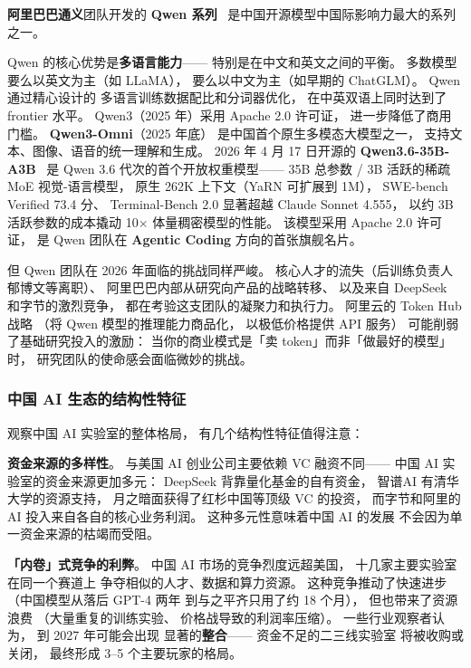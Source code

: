 \textbf{阿里巴巴通义}团队开发的 \textbf{Qwen 系列}~\cite{qwen2025qwen3}
是中国开源模型中国际影响力最大的系列之一。

Qwen 的核心优势是\textbf{多语言能力}——
特别是在中文和英文之间的平衡。
多数模型要么以英文为主（如 LLaMA），
要么以中文为主（如早期的 ChatGLM）。
Qwen 通过精心设计的
多语言训练数据配比和分词器优化，
在中英双语上同时达到了 frontier 水平。
Qwen3（2025 年）采用 Apache 2.0 许可证，
进一步降低了商用门槛。
\textbf{Qwen3-Omni}（2025 年底）
是中国首个原生多模态大模型之一，
支持文本、图像、语音的统一理解和生成。
2026 年 4 月 17 日开源的 \textbf{Qwen3.6-35B-A3B}~\cite{qwen36_35b_a3b_2026}
是 Qwen 3.6 代次的首个开放权重模型——
35B 总参数 / 3B 活跃的稀疏 MoE 视觉-语言模型，
原生 262K 上下文（YaRN 可扩展到 1M），
SWE-bench Verified 73.4 分、
Terminal-Bench 2.0 显著超越 Claude Sonnet 4.555，
以约 3B 活跃参数的成本撬动 10$\times$ 体量稠密模型的性能。
该模型采用 Apache 2.0 许可证，
是 Qwen 团队在 \textbf{Agentic Coding} 方向的首张旗舰名片。

但 Qwen 团队在 2026 年面临的挑战同样严峻。
核心人才的流失（后训练负责人郁博文等离职）、
阿里巴巴内部从研究向产品的战略转移、
以及来自 DeepSeek 和字节的激烈竞争，
都在考验这支团队的凝聚力和执行力。
阿里云的 Token Hub 战略
（将 Qwen 模型的推理能力商品化，
以极低价格提供 API 服务）
可能削弱了基础研究投入的激励：
当你的商业模式是「卖 token」而非「做最好的模型」时，
研究团队的使命感会面临微妙的挑战。

\subsubsection{中国 AI 生态的结构性特征}

观察中国 AI 实验室的整体格局，
有几个结构性特征值得注意：

\textbf{资金来源的多样性}。
与美国 AI 创业公司主要依赖 VC 融资不同——
中国 AI 实验室的资金来源更加多元：
DeepSeek 背靠量化基金的自有资金，
智谱AI 有清华大学的资源支持，
月之暗面获得了红杉中国等顶级 VC 的投资，
而字节和阿里的 AI 投入来自各自的核心业务利润。
这种多元性意味着中国 AI 的发展
不会因为单一资金来源的枯竭而受阻。

\textbf{「内卷」式竞争的利弊}。
中国 AI 市场的竞争烈度远超美国，
十几家主要实验室在同一个赛道上
争夺相似的人才、数据和算力资源。
这种竞争推动了快速进步
（中国模型从落后 GPT-4 两年
到与之平齐只用了约 18 个月），
但也带来了资源浪费
（大量重复的训练实验、
价格战导致的利润率压缩）。
一些行业观察者认为，
到 2027 年可能会出现
显著的\textbf{整合}——
资金不足的二三线实验室
将被收购或关闭，
最终形成 3--5 个主要玩家的格局。

